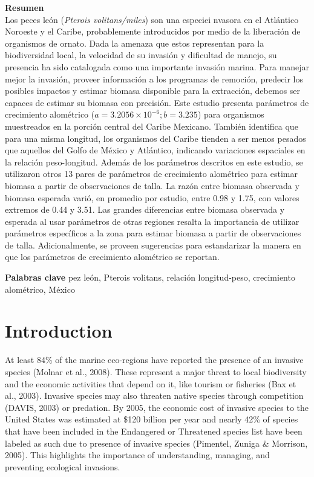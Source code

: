 \documentclass[12pt,]{article}
\begin{document}
\textbf{Resumen}\\
Los peces león (\emph{Pterois volitans/miles}) son una especiei nvasora
en el Atlántico Noroeste y el Caribe, probablemente introducidos por
medio de la liberación de organismos de ornato. Dada la amenaza que
estos representan para la biodiversidad local, la velocidad de su
invasión y dificultad de manejo, su presencia ha sido catalogada como
una importante invasión marina. Para manejar mejor la invasión, proveer
información a los programas de remoción, predecir los posibles impactos
y estimar biomasa disponible para la extracción, debemos ser capaces de
estimar su biomasa con precisión. Este estudio presenta parámetros de
crecimiento alométrico (\(a = 3.2056\times 10^{-6}; b = 3.235\)) para
organismos muestreados en la porción central del Caribe Mexicano.
También identifica que para una misma longitud, los organismos del
Caribe tienden a ser menos pesados que aquellos del Golfo de México y
Atlántico, indicando variaciones espaciales en la relación
peso-longitud. Además de los parámetros descritos en este estudio, se
utilizaron otros 13 pares de parámetros de crecimiento alométrico para
estimar biomasa a partir de observaciones de talla. La razón entre
biomasa observada y biomasa esperada varió, en promedio por estudio,
entre 0.98 y 1.75, con valores extremos de 0.44 y 3.51. Las grandes
diferencias entre biomasa observada y esperada al usar parámetros de
otras regiones resalta la importancia de utilizar parámetros específicos
a la zona para estimar biomasa a partir de observaciones de talla.
Adicionalmente, se proveen sugerencias para estandarizar la manera en
que los parámetros de crecimiento alométrico se reportan.

\textbf{Palabras clave} pez león, Pterois volitans, relación
longitud-peso, crecimiento alométrico, México

\clearpage

\section{Introduction}\label{introduction}

At least 84\% of the marine eco-regions have reported the presence of an
invasive species (Molnar et al., 2008). These represent a major threat
to local biodiversity and the economic activities that depend on it,
like tourism or fisheries (Bax et al., 2003). Invasive species may also
threaten native species through competition (DAVIS, 2003) or predation.
By 2005, the economic cost of invasive species to the United States was
estimated at \$120 billion per year and nearly 42\% of species that have
been included in the Endangered or Threatened species list have been
labeled as such due to presence of invasive species (Pimentel, Zuniga \&
Morrison, 2005). This highlights the importance of understanding,
managing, and preventing ecological invasions.
\end{document}
